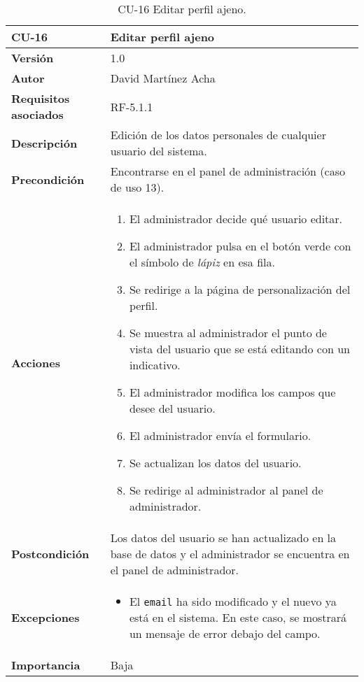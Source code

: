 \begin{table}[p]
	\centering
	\begin{tabularx}{\linewidth}{ p{} p{} }
		\toprule
		\textbf{CU-16}    & \textbf{Editar perfil ajeno}\\
		\toprule
		\textbf{Versión}              & 1.0    \\
		\textbf{Autor}                & David Martínez Acha \\
		\textbf{Requisitos asociados} & RF-5.1.1 \\
		\textbf{Descripción}          & Edición de los datos personales de cualquier usuario del sistema. \\
		\textbf{Precondición}         & Encontrarse en el panel de administración (caso de uso 13). \\
		\textbf{Acciones}             &
		\begin{enumerate}
			\def\labelenumi{\arabic{enumi}.}
			\tightlist
			\item El administrador decide qué usuario editar.
			\item El administrador pulsa en el botón verde con el símbolo de \textit{lápiz} en esa fila.
			\item Se redirige a la página de personalización del perfil.
			\item Se muestra al administrador el punto de vista del usuario que se está editando con un indicativo.
			\item El administrador modifica los campos que desee del usuario.
			\item El administrador envía el formulario.
			\item Se actualizan los datos del usuario.
			\item Se redirige al administrador al panel de administrador.
		\end{enumerate}\\
		\textbf{Postcondición}        & Los datos del usuario se han actualizado en la base de datos y el administrador se encuentra en el panel de administrador. \\
		\textbf{Excepciones}          & \begin{itemize}
			\item El \texttt{email} ha sido modificado y el nuevo ya está en el sistema. En este caso, se mostrará un mensaje de error debajo del campo.
		\end{itemize}\\
		\textbf{Importancia}          & Baja \\
		\bottomrule
	\end{tabularx}
	\caption{CU-16 Editar perfil ajeno.}
\end{table}


